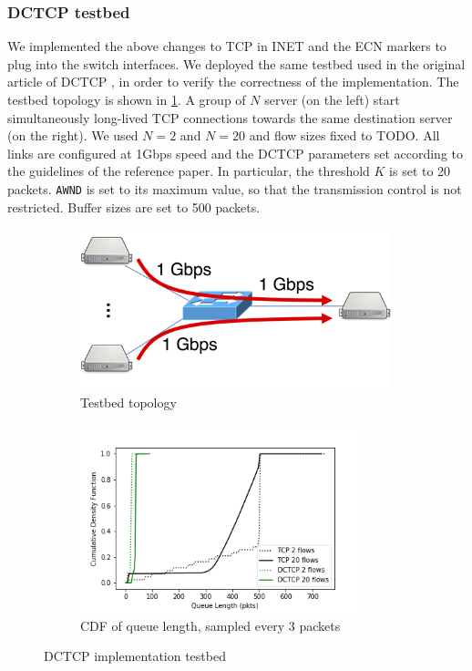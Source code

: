 \subsubsection{DCTCP testbed}
We implemented the above changes to TCP in INET and the ECN markers to plug into the switch interfaces. We deployed the same testbed used in the original article of DCTCP \cite{dctcp}, in order to verify the correctness of the implementation. The testbed topology is shown in \ref{fig:dctcp-testbed-topology}. A group of $N$ server (on the left) start simultaneously long-lived TCP connections towards the same destination server (on the right). We used $N=2$ and $N=20$ and flow sizes fixed to TODO. All links are configured at 1Gbps speed and the DCTCP parameters set according to the guidelines of the reference paper. In particular, the threshold $K$ is set to 20 packets. \texttt{AWND} is set to its maximum value, so that the transmission control is not restricted. Buffer sizes are set to 500 packets.\\ %
\begin{figure}
	\centering
	\begin{subfigure}{.35\textwidth}
		\centering
		\includegraphics[width=0.99\textwidth]{Chapter4/Figures/dctcp-testbed}
		\caption{Testbed topology}
		\label{fig:dctcp-testbed-topology}		
	\end{subfigure}%
	\hfill
	\begin{subfigure}{.65\textwidth}
		\centering
		\includegraphics[width=0.9\textwidth]{Chapter4/Figures/dctcp-qlen}
		\caption{CDF of queue length, sampled every 3 packets}
		\label{fig:dctcp-testbed-res}		
	\end{subfigure}%
	\caption{DCTCP implementation testbed}
	\label{fig:dctcp-testbed}
\end{figure}%
